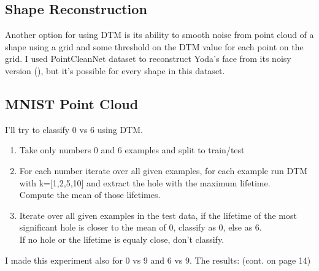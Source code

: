 \documentclass[11pt]{article}
\theoremstyle{definition}
\theoremstyle{definition}
\begin{document}
\subsection{Shape Reconstruction}


Another option for using DTM is its ability to smooth noise from point cloud of a shape using a grid and some threshold on the DTM value for each point on the grid. I used PointCleanNet dataset \cite{point} to reconstruct Yoda's face from its noisy version (), but it's possible for every shape in this dataset.


\subsection{MNIST Point Cloud}
I'll try to classify 0 vs 6 using DTM.
\begin{enumerate}
	\item
		Take only numbers 0 and 6 examples and split to train/test
	\item
		For each number iterate over all given examples, for each example run DTM with k=[1,2,5,10] and extract the hole with the maximum lifetime.\\
		Compute the mean of those lifetimes.
	\item
		Iterate over all given examples in the test data, if the lifetime of the most significant hole is closer to the mean of 0, classify as 0, else as 6.\\
		If no hole or the lifetime is equaly close, don't classify.
\end{enumerate}
I made this experiment also for 0 vs 9 and 6 vs 9.
The results: (cont. on page 14)
\end{document}
